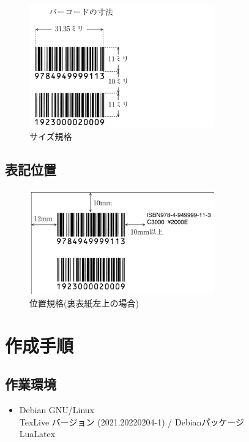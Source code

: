 \documentclass[a4paper,10pt,titlepage,pdfusetitle]{ltjsarticle}
\begin{document}
{\begin{figure}[H]
\centering
\includegraphics[width=8cm,angle=0]{./images/isbn-layout01.png}
\caption{サイズ規格}\vspace{-6mm} 
\end{figure}

\subsection{表記位置}\vspace{-6mm} 
\begin{figure}[H]
\centering
\includegraphics[width=8cm,angle=0]{./images/isbn-layout02.png}
\caption{位置規格(裏表紙左上の場合)} 
\end{figure}

\section{作成手順}   

\subsection{作業環境}

\begin{itemize}
  \item[] Debian GNU/Linux\\
  TexLive バージョン (2021.20220204-1) / Debianパッケージ\\
LuaLatex
\end{itemize}
\vspace{-4mm}

}
\end{document}
